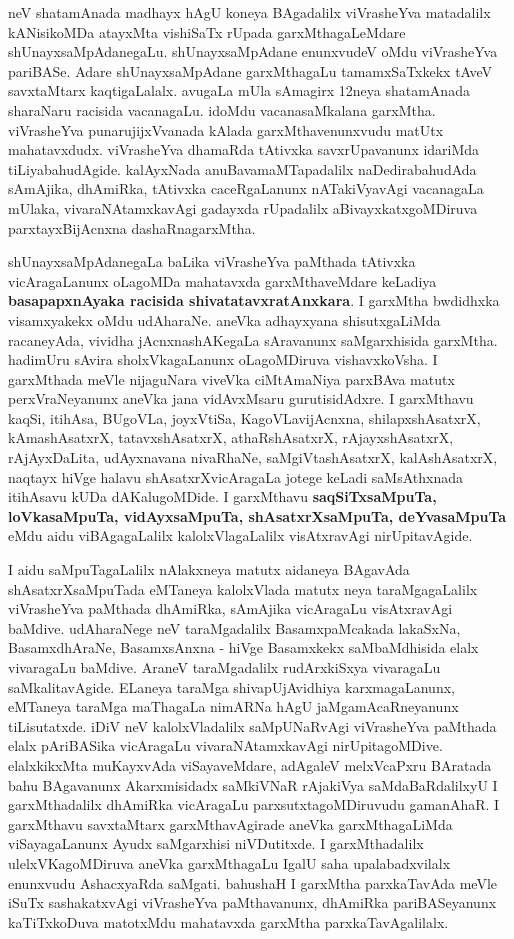 neV shatamAnada madhayx hAgU koneya BAgadalilx viVrasheYva matadalilx kANisikoMDa atayxMta vishiSaTx rUpada garxMtha\-gaLeMdare shUnayxsaMpAdanegaLu. shUnayxsaMpAdane enunxvudeV oMdu viVrasheYva pariBASe. Adare shUnayxsaMpAdane garxMthagaLu tamamxSaTxkekx tAveV savxtaMtarx kaqtigaLalalx. avugaLa mUla sAmagirx 12neya shatamAnada sharaNaru racisida vacanagaLu. idoMdu vacanasaMkalana garxMtha. viVrasheYva punarujijxVvanada kAlada garxMthavenunxvudu matUtx mahatavxdudx. viVrasheYva dhamaRda tAtivxka savxrUpavanunx idariMda tiLiyabahudAgide. kalAyxNada anuBavamaMTapadalilx naDedirabahudAda sAmAjika, dhAmiRka, tAtivxka caceRgaLanunx nATakiVya\-vAgi vacanagaLa mUlaka, vivaraNAtamxkavAgi gadayxda rUpadalilx aBivayxkatxgoMDiruva parxtayxBijAcnxna dashaRnagarxMtha. 

shUnayxsaMpAdanegaLa baLika viVrasheYva paMthada tAtivxka vicAragaLanunx oLagoMDa mahatavxda garxMthaveMdare keLadiya \textbf{basapapxnAyaka racisida shivatatavxratAnxkara}. I garxMtha bwdidhxka visamxyakekx oMdu udAharaNe. aneVka adhayxyana shisutxgaLiMda racaneyAda, vividha jAcnxna\-shAKegaLa sAravanunx saMgarxhisida garxMtha. hadimUru sAvira sholxVkagaLanunx oLagoMDiruva vishavxkoVsha. I garxMthada meVle nijaguNara viveVka ciMtAmaNiya parxBAva matutx perxVraNeyanunx aneVka jana vidAvxMsaru gurutisidAdxre. I garxMthavu kaqSi, itihAsa, BUgoVLa, joyxVtiSa, KagoVLavijAcnxna, shilapxshAsatxrX, kAmashAsatxrX, tatavxshAsatxrX, athaRshAsatxrX, rAjayxshAsatxrX, rAjAyxDaLita, udAyxnavana nivaRhaNe, saMgiVta\-shAsatxrX, kalAshAsatxrX, naqtayx hiVge halavu shAsatxrXvicAragaLa jotege keLadi saMsAthxnada itihAsavu kUDa dAKalugoMDide. I garxMthavu \textbf{saqSiTxsaMpuTa, loVkasaMpuTa, vidAyxsaMpuTa, shAsatxrXsaMpuTa, deYvasaMpuTa} eMdu aidu viBAgagaLalilx  kalolxVlagaLalilx visAtxravAgi nirUpitavAgide.

I aidu saMpuTagaLalilx nAlakxneya matutx aidaneya BAgavAda shAsatxrXsaMpuTada eMTaneya kalolxVlada  matutx  neya taraMgagaLalilx viVrasheYva paMthada dhAmiRka, sAmAjika vicAragaLu visAtxravAgi baMdive. udAharaNege neV taraMgadalilx Basamx\-paMcakada lakaSxNa, BasamxdhAraNe, BasamxsAnxna - hiVge Basamxkekx saMbaMdhisida elalx vivaragaLu baMdive. AraneV taraMgadalilx rudArxkiSxya vivaragaLu saMkalitavAgide. ELaneya taraMga shivapUjAvidhiya karxmagaLanunx, eMTaneya taraMga maThagaLa nimARNa hAgU jaMgamAcaRne\-yanunx tiLisutatxde. iDiV neV kalolxVladalilx saMpUNaRvAgi viVrasheYva paMthada elalx pAriBASika vicAragaLu vivaraNAtamxkavAgi nirUpitagoMDive. elalxkikxMta muKayxvAda viSayaveMdare, adAgaleV melxVcaPxru BAratada bahu BAgavanunx Akarxmisidadx saMkiVNaR rAjakiVya saMdaBaRdalilxyU I garxMthadalilx dhAmiRka vicAragaLu parxsutxtagoMDiruvudu gamanAhaR. I garxMthavu savxtaMtarx garxMthavAgirade aneVka garxMthagaLiMda viSayagaLanunx Ayudx saMgarxhisi niVDutitxde. I garxMthadalilx ulelxVKagoMDiruva aneVka garxMthagaLu IgalU saha upalabadxvilalx enunxvudu AshacxyaRda saMgati. bahushaH I garxMtha parxkaTavAda meVle iSuTx  sashakatxvAgi viVrasheYva paMthavanunx, dhAmiRka pariBASeyanunx kaTiTxkoDuva matotxMdu mahatavxda garxMtha parxkaTavAgalilalx.

